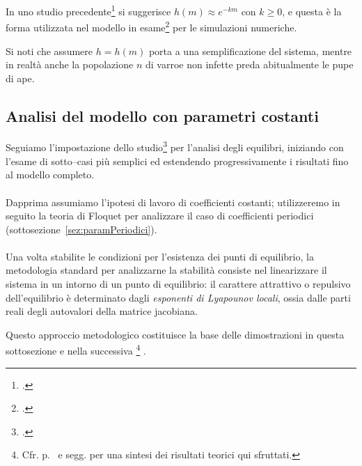 In uno studio precedente\footcite{sumMar04} si suggerisce $h(m) \approx e^{-km}$ con $k\geq0$, e questa è la
forma utilizzata nel modello in esame\footcite{ratti2017} per le simulazioni numeriche.

Si noti che assumere $h=h(m)$ porta a una semplificazione del sistema, mentre in realtà anche la
popolazione $n$ di varroe non infette preda abitualmente le pupe di ape.


\subsection{Analisi del modello con parametri costanti}
Seguiamo l'impostazione dello studio\footcite{ratti2017} per l'analisi degli equilibri, iniziando con l'esame
di sotto--casi più semplici ed estendendo progressivamente i risultati fino al modello completo.

\paragraph{}
Dapprima assumiamo l'ipotesi di lavoro di coefficienti costanti; utilizzeremo in seguito la teoria di Floquet per analizzare il caso di coefficienti periodici (sottosezione~\ref{sez:paramPeriodici}).

\paragraph{}
Una volta stabilite le condizioni per l'esistenza dei punti di equilibrio, la metodologia standard per analizzarne la stabilità consiste nel linearizzare il sistema in un intorno di un punto di equilibrio: il carattere attrattivo o repulsivo dell'equilibrio è determinato dagli \emph{esponenti di Lyapounov locali}, ossia dalle parti reali degli autovalori della matrice jacobiana.

Questo approccio metodologico costituisce la base delle dimostrazioni in questa sottosezione e nella successiva
\footnote{Cfr. p.~\pageref{chap:teoria} e segg. per una sintesi dei risultati teorici qui sfruttati.}
.

